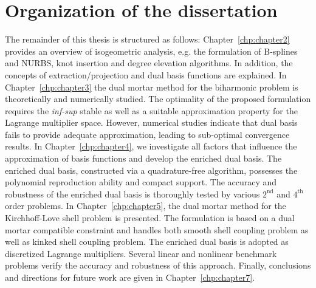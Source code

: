 \section{Organization of the dissertation}

The remainder of this thesis is structured as follows: Chapter~\ref{chp:chapter2} provides an overview of isogeometric analysis, e.g. the formulation of B-splines and NURBS, knot insertion and degree elevation algorithms. In addition, the concepts of \Bezier extraction/projection and dual basis functions are explained. In Chapter~\ref{chp:chapter3} the \Bezier dual mortar method for the biharmonic problem is theoretically and numerically studied. The optimality of the proposed formulation requires the \textit{inf-sup} stable as well as a suitable approximation property for the Lagrange multiplier space. However, numerical studies indicate that \Bezier dual basis fails to provide adequate approximation, leading to sub-optimal convergence results. In Chapter~\ref{chp:chapter4}, we investigate all factors that influence the approximation of basis functions and develop the enriched \Bezier dual basis. The enriched \Bezier dual basis, constructed via a quadrature-free algorithm, possesses the polynomial reproduction ability and compact support. The accuracy and robustness of the enriched \Bezier dual basis is thoroughly tested by various $2^\text{nd}$ and $4^\text{th}$ order problems. In Chapter~\ref{chp:chapter5}, the \Bezier dual mortar method for the Kirchhoff-Love shell problem is presented. The formulation is based on a dual mortar compatible constraint and handles both smooth shell coupling problem as well as kinked shell coupling problem. The enriched \Bezier dual basis is adopted as discretized Lagrange multipliers. Several linear and nonlinear benchmark problems verify the accuracy and robustness of this approach. Finally, conclusions and directions for future work are given in Chapter~\ref{chp:chapter7}. 